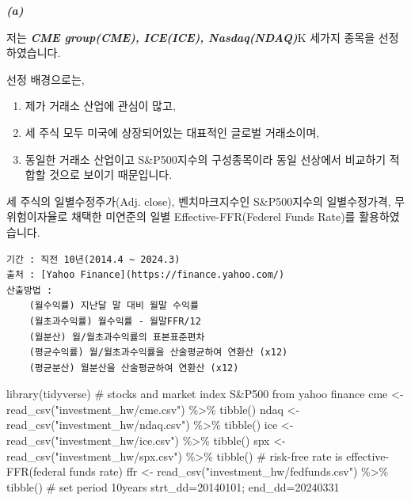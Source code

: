 \documentclass[
  letterpaper,
  DIV=11,
  numbers=noendperiod]{scrreprt}
\newenvironment{Shaded}{\begin{snugshade}}{\end{snugshade}}
\newcommand{\CommentTok}[1]{\textcolor[rgb]{0.37,0.37,0.37}{#1}}
\newcommand{\FunctionTok}[1]{\textcolor[rgb]{0.28,0.35,0.67}{#1}}
\newcommand{\NormalTok}[1]{\textcolor[rgb]{0.00,0.23,0.31}{#1}}
\newcommand{\OtherTok}[1]{\textcolor[rgb]{0.00,0.23,0.31}{#1}}
\newcommand{\SpecialCharTok}[1]{\textcolor[rgb]{0.37,0.37,0.37}{#1}}
\newcommand{\StringTok}[1]{\textcolor[rgb]{0.13,0.47,0.30}{#1}}
\providecommand{\tightlist}{%
  \setlength{\itemsep}{0pt}\setlength{\parskip}{0pt}}\usepackage{longtable,booktabs,array}
\begin{document}

\textbf{\emph{(a)}}

저는 \textbf{\emph{CME group(CME), ICE(ICE), Nasdaq(NDAQ)}}K 세가지
종목을 선정하였습니다.

선정 배경으로는,

\begin{enumerate}
\def\labelenumi{(\arabic{enumi})}
\tightlist
\item
  제가 거래소 산업에 관심이 많고,
\item
  세 주식 모두 미국에 상장되어있는 대표적인 글로벌 거래소이며,
\item
  동일한 거래소 산업이고 S\&P500지수의 구성종목이라 동일 선상에서
  비교하기 적합할 것으로 보이기 때문입니다.
\end{enumerate}

세 주식의 일별수정주가(Adj. close), 벤치마크지수인 S\&P500지수의
일별수정가격, 무위험이자율로 채택한 미연준의 일별 Effective-FFR(Federel
Funds Rate)를 활용하였습니다.

\begin{verbatim}
기간 : 직전 10년(2014.4 ~ 2024.3)
출처 : [Yahoo Finance](https://finance.yahoo.com/)
산출방법 :
    (월수익률) 지난달 말 대비 월말 수익률
    (월초과수익률) 월수익률 - 월말FFR/12
    (월분산) 월/월초과수익률의 표본표준편차
    (평균수익률) 월/월초과수익률을 산술평균하여 연환산 (x12)
    (평균분산) 월분산을 산술평균하여 연환산 (x12)
\end{verbatim}

\begin{Shaded}
\begin{Highlighting}[]
\FunctionTok{library}\NormalTok{(tidyverse)}
\CommentTok{\# stocks and market index S\&P500 from yahoo finance}
\NormalTok{cme }\OtherTok{\textless{}{-}} \FunctionTok{read\_csv}\NormalTok{(}\StringTok{"investment\_hw/cme.csv"}\NormalTok{) }\SpecialCharTok{\%\textgreater{}\%} \FunctionTok{tibble}\NormalTok{()}
\NormalTok{ndaq }\OtherTok{\textless{}{-}} \FunctionTok{read\_csv}\NormalTok{(}\StringTok{"investment\_hw/ndaq.csv"}\NormalTok{) }\SpecialCharTok{\%\textgreater{}\%} \FunctionTok{tibble}\NormalTok{()}
\NormalTok{ice }\OtherTok{\textless{}{-}} \FunctionTok{read\_csv}\NormalTok{(}\StringTok{"investment\_hw/ice.csv"}\NormalTok{) }\SpecialCharTok{\%\textgreater{}\%} \FunctionTok{tibble}\NormalTok{()}
\NormalTok{spx }\OtherTok{\textless{}{-}} \FunctionTok{read\_csv}\NormalTok{(}\StringTok{"investment\_hw/spx.csv"}\NormalTok{) }\SpecialCharTok{\%\textgreater{}\%} \FunctionTok{tibble}\NormalTok{()}
\CommentTok{\# risk{-}free rate is effective{-}FFR(federal funds rate)}
\NormalTok{ffr }\OtherTok{\textless{}{-}} \FunctionTok{read\_csv}\NormalTok{(}\StringTok{"investment\_hw/fedfunds.csv"}\NormalTok{) }\SpecialCharTok{\%\textgreater{}\%} \FunctionTok{tibble}\NormalTok{()}
\CommentTok{\# set period 10years}
\NormalTok{strt\_dd}\OtherTok{=}\StringTok{\textquotesingle{}20140101\textquotesingle{}}\NormalTok{; end\_dd}\OtherTok{=}\StringTok{\textquotesingle{}20240331\textquotesingle{}}
\end{Highlighting}
\end{Shaded}
\end{document}
